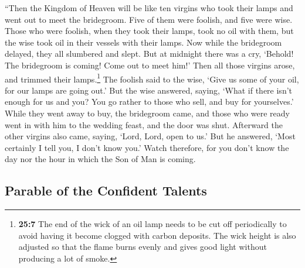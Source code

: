  ``Then the Kingdom of Heaven will be like ten virgins who
took their lamps and went out to meet the bridegroom. 
Five of them were foolish, and five were wise.  Those who
were foolish, when they took their lamps, took no oil with them,
 but the wise took oil in their vessels with their lamps.
 Now while the bridegroom delayed, they all slumbered and
slept.  But at midnight there was a cry, `Behold! The
bridegroom is coming! Come out to meet him!'  Then all
those virgins arose, and trimmed their lamps.\footnote{\textbf{25:7} The
  end of the wick of an oil lamp needs to be cut off periodically to
  avoid having it become clogged with carbon deposits. The wick height
  is also adjusted so that the flame burns evenly and gives good light
  without producing a lot of smoke.}  The foolish said to
the wise, `Give us some of your oil, for our lamps are going out.'
 But the wise answered, saying, `What if there isn't
enough for us and you? You go rather to those who sell, and buy for
yourselves.'  While they went away to buy, the bridegroom
came, and those who were ready went in with him to the wedding feast,
and the door was shut.  Afterward the other virgins also
came, saying, `Lord, Lord, open to us.'  But he answered,
`Most certainly I tell you, I don't know you.'  Watch
therefore, for you don't know the day nor the hour in which the Son of
Man is coming.

\hypertarget{parable-of-the-confident-talents}{%
\subsection{Parable of the Confident
Talents}\label{parable-of-the-confident-talents}}

